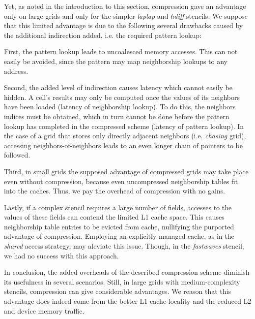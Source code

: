 Yet, as noted in the introduction to this section, compression gave an advantage only on large grids and only for the simpler \emph{laplap} and \emph{hdiff} stencils. We suppose that this limited advantage is due to the following several drawbacks caused by the additional indirection added, i.e. the required pattern lookup:

First, the pattern lookup leads to uncoalesced memory accesses. This can not easily be avoided, since the pattern may map neighborship lookups to any address.

Second, the added level of indirection causes latency which cannot easily be hidden. A cell's results may only be computed once the values of its neighbors have been loaded (latency of neighborship lookup). To do this, the neighbors indices must be obtained, which in turn cannot be done before the pattern lookup has completed in the compressed scheme (latency of pattern lookup). In the case of a grid that stores only directly adjacent neighbors (i.e. \emph{chasing} grid), accessing neighbors-of-neighbors leads to an even longer chain of pointers to be followed.

Third, in small grids the supposed advantage of compressed grids may take place even without compression, because even uncompressed neighborship tables fit into the caches. Thus, we pay the overhead of compression with no gains.

Lastly, if a complex stencil requires a large number of fields, accesses to the values of these fields can contend the limited L1 cache space. This causes neighborship table entries to be evicted from cache, nullifying the purported advantage of compression. Employing an explicitly managed cache, as in the \emph{shared} access strategy, may aleviate this issue. Though, in the \emph{fastwaves} stencil, we had no success with this approach.

In conclusion, the added overheads of the described compression scheme diminish its usefulness in several scenarios. Still, in large grids with medium-complexity stencils, compression can give considerable advantages. We reason that this advantage does indeed come from the better L1 cache locality and the reduced L2 and device memory traffic. 

% 

